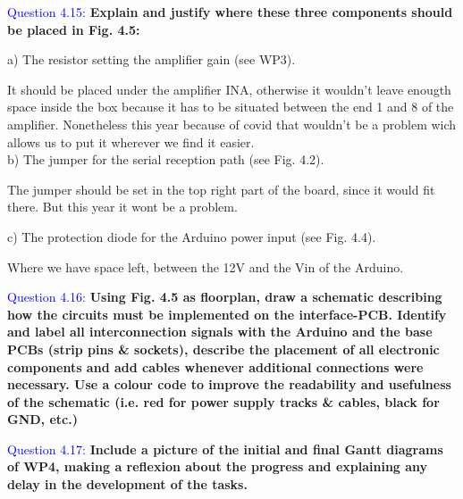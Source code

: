 \documentclass[12pt, a4papre]{article}
\begin{document}
	\textcolor{blue}{Question 4.15:} \textbf{Explain and justify where these three components should be placed in Fig. 4.5: }
	
	a)  The resistor setting the amplifier gain (see WP3).
	
	It should be placed under the amplifier INA, otherwise it wouldn't leave enougth space inside the box because it has to be situated between the end 1 and 8 of the amplifier. Nonetheless this year because of covid that wouldn't be a problem wich allows us to put it wherever we find it easier.\\
	
	b)  The jumper for the serial reception path (see Fig. 4.2).
	
	The jumper should be set in the top right part of the board, since it would fit there. But this year it wont be a problem.
	
	c)  The protection diode for the Arduino power input (see Fig. 4.4).
	
	Where we have space left, between the 12V and the Vin of the Arduino.
	
	

	\textcolor{blue}{Question 4.16:} \textbf{Using Fig. 4.5 as floorplan, draw a schematic describing how the circuits must be implemented on the interface-PCB. Identify and label all interconnection signals with the Arduino and the base PCBs (strip pins \& sockets), describe the placement of all electronic components and add cables whenever additional connections were necessary. Use a colour code to improve the readability and usefulness of the schematic (i.e. red for power supply tracks \& cables, black for GND, etc.)}

	\textcolor{blue}{Question 4.17:} \textbf{Include a picture of the initial and final Gantt diagrams of WP4, making a reflexion about the progress and explaining any delay in the development of the tasks.}
	
\end{document}
